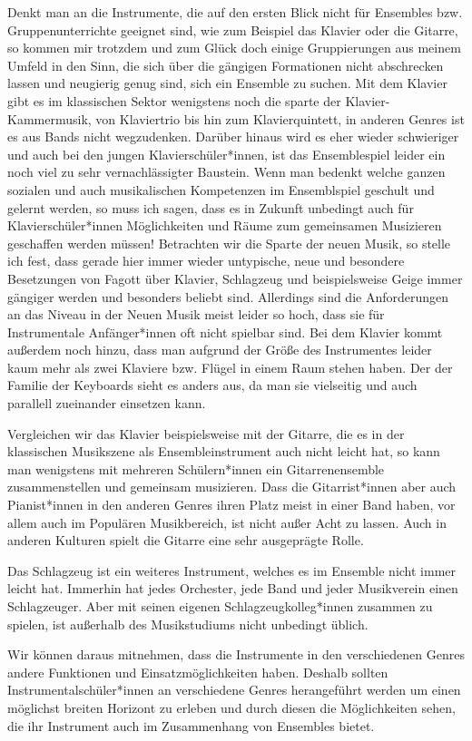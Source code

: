 Denkt man an die Instrumente, die auf den ersten Blick nicht für Ensembles bzw.
Gruppenunterrichte geeignet sind, wie zum Beispiel das Klavier oder die Gitarre,
so kommen mir trotzdem und zum Glück doch einige Gruppierungen aus meinem Umfeld
in den Sinn, die sich über die gängigen Formationen nicht abschrecken lassen und
neugierig genug sind, sich ein Ensemble zu suchen. Mit dem Klavier gibt es im
klassischen Sektor wenigstens noch die sparte der Klavier-Kammermusik, von
Klaviertrio bis hin zum Klavierquintett, in anderen Genres ist es aus Bands
nicht wegzudenken. Darüber hinaus wird es eher wieder schwieriger und auch
bei den jungen Klavierschüler*innen, ist das Ensemblespiel leider ein noch viel
zu sehr vernachlässigter Baustein. Wenn man bedenkt welche ganzen sozialen und
auch musikalischen Kompetenzen im Ensemblspiel geschult und gelernt werden, so
muss ich sagen, dass es in Zukunft unbedingt auch für Klavierschüler*innen
Möglichkeiten und Räume zum gemeinsamen Musizieren geschaffen werden müssen!
Betrachten wir die Sparte der neuen Musik, so stelle ich fest, dass gerade
hier immer wieder untypische, neue und besondere Besetzungen von Fagott über
Klavier, Schlagzeug und beispielsweise Geige immer gängiger werden und besonders
beliebt sind. Allerdings sind die Anforderungen an das Niveau in der Neuen Musik
meist leider so hoch, dass sie für Instrumentale Anfänger*innen oft nicht
spielbar sind. Bei dem Klavier kommt außerdem noch hinzu, dass man aufgrund der
Größe des Instrumentes leider kaum mehr als zwei Klaviere bzw. Flügel in einem
Raum stehen haben. Der der Familie der Keyboards sieht es anders aus, da man sie
vielseitig und auch parallell zueinander einsetzen kann.

Vergleichen wir das Klavier beispielsweise mit der Gitarre, die es in der
klassischen Musikszene als Ensembleinstrument auch nicht leicht hat, so kann man
wenigstens mit mehreren Schülern*innen ein Gitarrenensemble zusammenstellen und
gemeinsam musizieren. Dass die Gitarrist*innen aber auch Pianist*innen in den anderen
Genres ihren Platz meist in einer Band haben, vor allem auch im Populären
Musikbereich, ist nicht außer Acht zu lassen. Auch in anderen Kulturen spielt
die Gitarre eine sehr ausgeprägte Rolle.

Das Schlagzeug ist ein weiteres
Instrument, welches es im Ensemble nicht immer leicht hat. Immerhin hat jedes
Orchester, jede Band und jeder Musikverein einen Schlagzeuger. Aber mit seinen
eigenen Schlagzeugkolleg*innen zusammen zu spielen, ist außerhalb des
Musikstudiums nicht unbedingt üblich. 

Wir können daraus mitnehmen, dass die Instrumente in den verschiedenen Genres
andere Funktionen und Einsatzmöglichkeiten haben. Deshalb sollten
Instrumentalschüler*innen an verschiedene Genres herangeführt werden um einen
möglichst breiten Horizont zu erleben und durch diesen die Möglichkeiten sehen,
die ihr Instrument auch im Zusammenhang von Ensembles bietet. 





